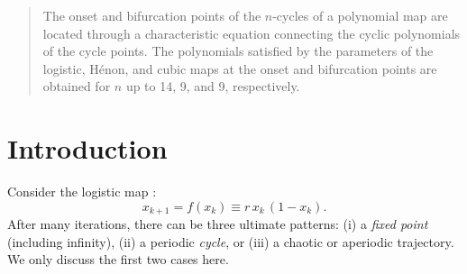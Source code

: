\documentclass{ws-ijbc}
\begin{document}
\begin{abstract}
The onset and bifurcation points of the $n$-cycles of
  a polynomial map are located
  through a characteristic equation
  connecting the cyclic polynomials of the cycle points.
The polynomials satisfied by the parameters
  of the logistic, H\'enon, and cubic maps
  at the onset and bifurcation points are obtained
  for $n$ up to 14, 9, and 9,
  respectively.
\end{abstract}





%
%
\section{Introduction}
%
%

Consider the logistic map \cite{may, strogatz}:
%
\begin{equation}
  x_{k+1} = f(x_k) \equiv r \, x_k \, ( 1 - x_k ).
\label{eq:logmap}
\end{equation}
%
%
%
%
%
After many iterations, there can be three ultimate patterns:
  (i) a \emph{fixed point} (including infinity),
  (ii) a periodic \emph{cycle},
or
  (iii) a chaotic or aperiodic trajectory.
We only discuss the first two cases here.
\end{document}
